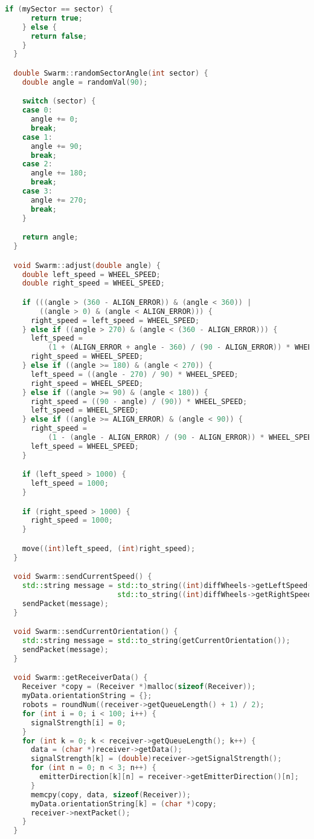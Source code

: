 \begin{lstlisting}[language=C++, caption={swarm.cpp},label={lst:swarm-header}]
    if (mySector == sector) {
      return true;
    } else {
      return false;
    }
  }

  double Swarm::randomSectorAngle(int sector) {
    double angle = randomVal(90);

    switch (sector) {
    case 0:
      angle += 0;
      break;
    case 1:
      angle += 90;
      break;
    case 2:
      angle += 180;
      break;
    case 3:
      angle += 270;
      break;
    }

    return angle;
  }

  void Swarm::adjust(double angle) {
    double left_speed = WHEEL_SPEED;
    double right_speed = WHEEL_SPEED;

    if (((angle > (360 - ALIGN_ERROR)) & (angle < 360)) |
        ((angle > 0) & (angle < ALIGN_ERROR))) {
      right_speed = left_speed = WHEEL_SPEED;
    } else if ((angle > 270) & (angle < (360 - ALIGN_ERROR))) {
      left_speed =
          (1 + (ALIGN_ERROR + angle - 360) / (90 - ALIGN_ERROR)) * WHEEL_SPEED;
      right_speed = WHEEL_SPEED;
    } else if ((angle >= 180) & (angle < 270)) {
      left_speed = ((angle - 270) / 90) * WHEEL_SPEED;
      right_speed = WHEEL_SPEED;
    } else if ((angle >= 90) & (angle < 180)) {
      right_speed = ((90 - angle) / (90)) * WHEEL_SPEED;
      left_speed = WHEEL_SPEED;
    } else if ((angle >= ALIGN_ERROR) & (angle < 90)) {
      right_speed =
          (1 - (angle - ALIGN_ERROR) / (90 - ALIGN_ERROR)) * WHEEL_SPEED;
      left_speed = WHEEL_SPEED;
    }

    if (left_speed > 1000) {
      left_speed = 1000;
    }

    if (right_speed > 1000) {
      right_speed = 1000;
    }

    move((int)left_speed, (int)right_speed);
  }

  void Swarm::sendCurrentSpeed() {
    std::string message = std::to_string((int)diffWheels->getLeftSpeed()) + " " +
                          std::to_string((int)diffWheels->getRightSpeed());
    sendPacket(message);
  }

  void Swarm::sendCurrentOrientation() {
    std::string message = std::to_string(getCurrentOrientation());
    sendPacket(message);
  }

  void Swarm::getReceiverData() {
    Receiver *copy = (Receiver *)malloc(sizeof(Receiver));
    myData.orientationString = {};
    robots = roundNum((receiver->getQueueLength() + 1) / 2);
    for (int i = 0; i < 100; i++) {
      signalStrength[i] = 0;
    }
    for (int k = 0; k < receiver->getQueueLength(); k++) {
      data = (char *)receiver->getData();
      signalStrength[k] = (double)receiver->getSignalStrength();
      for (int n = 0; n < 3; n++) {
        emitterDirection[k][n] = receiver->getEmitterDirection()[n];
      }
      memcpy(copy, data, sizeof(Receiver));
      myData.orientationString[k] = (char *)copy;
      receiver->nextPacket();
    }
  }


\end{lstlisting}
